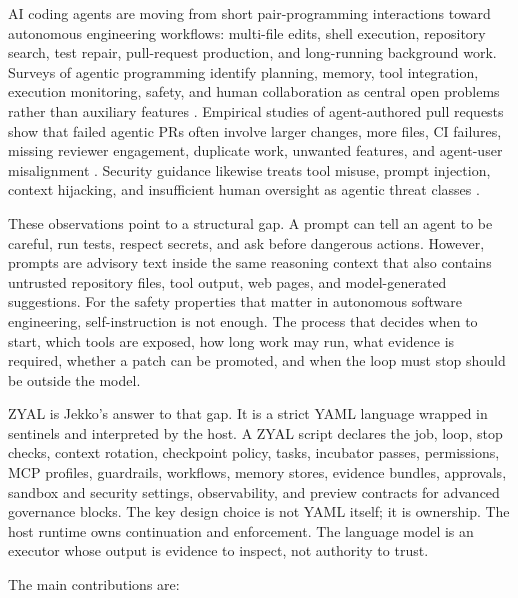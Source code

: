 \documentclass[conference]{IEEEtran}
\newcommand{\ZYAL}{ZYAL}
\begin{document}
AI coding agents are moving from short pair-programming interactions toward autonomous engineering workflows: multi-file edits, shell execution, repository search, test repair, pull-request production, and long-running background work. Surveys of agentic programming identify planning, memory, tool integration, execution monitoring, safety, and human collaboration as central open problems rather than auxiliary features \cite{agenticProgrammingSurvey2025}. Empirical studies of agent-authored pull requests show that failed agentic PRs often involve larger changes, more files, CI failures, missing reviewer engagement, duplicate work, unwanted features, and agent-user misalignment \cite{failedAgenticPRs2026}. Security guidance likewise treats tool misuse, prompt injection, context hijacking, and insufficient human oversight as agentic threat classes \cite{owaspAgentic2026}.

These observations point to a structural gap. A prompt can tell an agent to be careful, run tests, respect secrets, and ask before dangerous actions. However, prompts are advisory text inside the same reasoning context that also contains untrusted repository files, tool output, web pages, and model-generated suggestions. For the safety properties that matter in autonomous software engineering, self-instruction is not enough. The process that decides when to start, which tools are exposed, how long work may run, what evidence is required, whether a patch can be promoted, and when the loop must stop should be outside the model.

\ZYAL{} is Jekko's answer to that gap. It is a strict YAML language wrapped in sentinels and interpreted by the host. A \ZYAL{} script declares the job, loop, stop checks, context rotation, checkpoint policy, tasks, incubator passes, permissions, MCP profiles, guardrails, workflows, memory stores, evidence bundles, approvals, sandbox and security settings, observability, and preview contracts for advanced governance blocks. The key design choice is not YAML itself; it is ownership. The host runtime owns continuation and enforcement. The language model is an executor whose output is evidence to inspect, not authority to trust.

The main contributions are:
\end{document}
